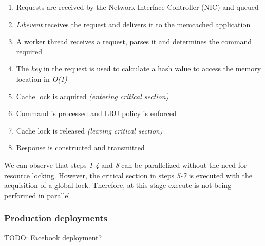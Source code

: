 \begin{enumerate}
    \item Requests are received by the Network Interface Controller (NIC) and queued
    \item \emph{Libevent} receives the request and delivers it to the memcached application
    \item A worker thread receives a request, parses it and determines the command required
    \item The \emph{key} in the request is used to calculate a hash value to access the memory location in \emph{O(1)}
    \item Cache lock is acquired \emph{(entering critical section)}
    \item Command is processed and LRU policy is enforced
    \item Cache lock is released \emph{(leaving critical section)}
    \item Response is constructed and transmitted \cite{wiggins2012enhancing}
\end{enumerate}

We can observe that steps \textit{1-4} and \textit{8} can be parallelized without the need for resource locking. However, the critical section in steps \textit{5-7} is executed with the acquisition of a global lock. Therefore, at this stage execute is not being performed in parallel.


\subsubsection{Production deployments}
TODO: Facebook deployment?



